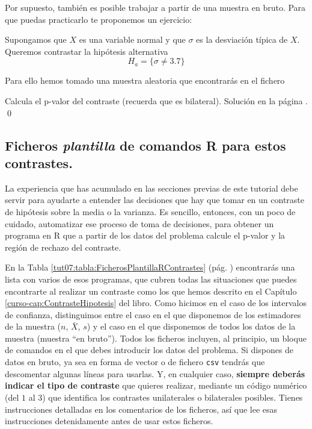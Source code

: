 \documentclass[10pt,a4paper]{article}\usepackage[]{graphicx}\usepackage[]{color}
\newcounter {cont01}
\begin{document}
Por supuesto, también es posible trabajar a partir de una muestra en bruto.
Para que puedas practicarlo te proponemos un ejercicio:

\begin{ejercicio}
\label{tut07:ejercicio10}
Supongamos que $X$ es una variable normal y que $\sigma$ es la desviación típica de $X$. Queremos contrastar la hipótesis alternativa
\[H_a=\{\sigma \neq 3.7\}\]

Para ello hemos tomado una muestra aleatoria que encontrarás en el fichero
\begin{center}
\end{center}
Calcula el p-valor del contraste (recuerda que es bilateral). Solución en la página \pageref{tut07:ejercicio10:sol}.
\qed
\end{ejercicio}


\subsection{Ficheros {\em plantilla} de comandos R para estos contrastes.}
\label{tut07:subsec:FicherosPlantillaRContrastes}

La experiencia que has acumulado en las secciones previas de este tutorial debe servir para ayudarte a entender las decisiones que hay que tomar en un contraste de hipótesis sobre la media o la varianza. Es sencillo, entonces, con un poco de cuidado, automatizar ese proceso de toma de decisiones, para obtener un programa en R que a partir de los datos del problema calcule el p-valor y la región de rechazo del contraste.

En la Tabla \ref{tut07:tabla:FicherosPlantillaRContrastes} (pág. \pageref{tut07:tabla:FicherosPlantillaRContrastes}) encontrarás una lista con varios de esos programas, que cubren todas las situaciones que puedes encontrarte al realizar un contraste como los que hemos descrito en el Capítulo \ref{curso-cap:ContrasteHipotesis} del libro.   Como hicimos en el caso de los intervalos de confianza, distinguimos entre el caso en el que disponemos de los estimadores de la muestra ($n$, $\bar X$, $s$) y el caso en el que disponemos de todos los datos de la muestra (muestra ``en bruto'').  Todos los ficheros incluyen, al principio, un bloque de comandos en el que debes introducir los datos del problema. Si dispones de datos en bruto, ya sea en forma de vector o de fichero {\tt csv} tendrás que descomentar algunas líneas para usarlas. Y, en cualquier caso, {\bf siempre deberás indicar el tipo de contraste} que quieres realizar, mediante un código numérico (del $1$ al $3$) que identifica los contrastes unilaterales o bilaterales posibles. Tienes instrucciones detalladas en los comentarios de los ficheros, así que lee esas instrucciones detenidamente
antes de usar estos ficheros.
\end{document}
